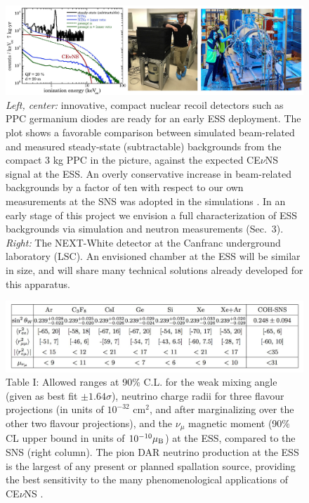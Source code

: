 \begin{figure}[htb!]
\begin{center}
\includegraphics[width=6.5in]{fig3.pdf}
\caption{\label{fig:fig3} \scriptsize {\it Left, center:} innovative, compact nuclear recoil detectors such as PPC germanium diodes \cite{ppc} are ready for an early ESS deployment. The plot shows a favorable comparison between simulated beam-related and measured steady-state (subtractable) backgrounds from the compact 3 kg PPC in the picture, against the expected CE$\nu$NS signal at the ESS. An overly conservative increase in beam-related backgrounds by a factor of ten with respect to our own measurements at the SNS  was adopted in the simulations \cite{ESS}. In an early stage of this project we envision a full characterization of ESS backgrounds via simulation and neutron measurements (Sec.\ 3). {\it Right:} The NEXT-White detector at the Canfranc underground laboratory (LSC). An envisioned chamber at the ESS will be similar in size, and will share many technical solutions already developed for this apparatus.}
\end{center}
\end{figure}


\begin{figure}[htb!]
\begin{center}
\includegraphics[width=6.5in]{table.pdf}
\caption{\label{fig:figx} \scriptsize 
Table I: Allowed ranges at 90\% C.L. for the weak mixing
  angle (given as best fit $\pm 1.64 \sigma$), neutrino charge radii for three flavour
  projections  (in units of $10^{-32}$ cm$^2$, and after
  marginalizing over the other two flavour projections), and 
  the $\nu_\mu$ magnetic moment (90\% CL upper bound in units of
  $10^{-10} \mu_{\rm B}$) at the ESS, compared to the SNS (right column). The pion DAR neutrino production at the ESS is the largest of any present or planned spallation source, providing the best sensitivity to the many phenomenological applications of CE$\nu$NS \cite{ESS}. }
\end{center} 
\end{figure}


